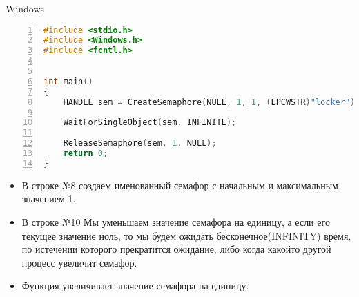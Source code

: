 \documentclass[a4paper,12pt]{article}
\begin{document}
  \begin{center}
    Windows
  \end{center}

        \begin{lstlisting}[language=c,
                           breaklines=true,
                           showtabs=false,
                           showspaces=false,
                           showstringspaces=false,
                           numbers=left,
                           extendedchars=true,
                           numberstyle=\footnotesize,
                           stepnumber=1,
                           basicstyle=\ttfamily \footnotesize]
#include <stdio.h>
#include <Windows.h>
#include <fcntl.h>


int main()
{
    HANDLE sem = CreateSemaphore(NULL, 1, 1, (LPCWSTR)"locker");

    WaitForSingleObject(sem, INFINITE);

    ReleaseSemaphore(sem, 1, NULL);
    return 0;
}

\end{lstlisting}

\begin{flushleft}
  \begin{itemize}
   \item В строке №8 создаем именованный семафор с начальным и максимальным значением 1.
   \item В строке №10 Мы уменьшаем значение семафора на единицу, а если его текущее значение ноль, то мы будем ожидать бесконечное(INFINITY) время, по истечении которого прекратится ожидание, либо когда какойто другой процесс увеличит семафор.
   \item Функция  увеличивает значение семафора на единицу. 
  \end{itemize}

\end{flushleft}
\end{document}
